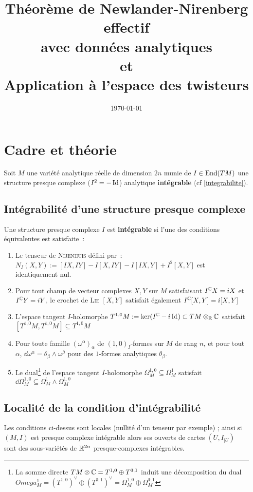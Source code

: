 \documentclass[a4paper,draft]{amsart}
\title[Newlander-Nirenberg effectif]{Th\'eor\`eme de Newlander-Nirenberg effectif\\ avec donn\'ees analytiques\\
et\\
Application \`a l'espace des twisteurs}
\date\today
\begin{document}
\maketitle

\tableofcontents

\section{Cadre et théorie}
Soit $M$ une variété analytique réelle de dimension $2n$ munie de $I \in \text{End}(TM)$ une structure presque complexe ($I^2 = -\operatorname{Id}$) analytique \textbf{intégrable} (cf \ref{integrabilite}).

\subsection{Intégrabilité d'une structure presque complexe\label{integrabilite}}\cite{Godbillon1969,Voisin2002}
Une structure presque complexe $I$ est \textbf{intégrable} si l'une des conditions équivalentes est satisfaite~:
\begin{enumerate}[($i$)]
\item Le tenseur de \textsc{Nijenhuis} défini par~: $N_I(X,Y) := [ I X , I Y ] - I [ X , I Y ] - I [ I X , Y ] + I^2 [ X , Y ]$ est identiquement nul.
\item Pour tout champ de vecteur complexes $X,Y$ sur $M$ satisfaisant $I^{\mathbb{C}} X=iX$ et $I^{\mathbb{C}} Y=iY$, le crochet de \textsc{Lie} $[X,Y]$ satisfait également $I^{\mathbb{C}}[X,Y] = i[X,Y]$
\item L'espace tangent $I$-holomorphe $T^{1,0}M := \ker(I^{\mathbb{C}} -  i\operatorname{Id}) \subset TM \otimes_{\mathbb{R}} \mathbb{C}$ satisfait $[T^{1,0}M,T^{1,0}M] \subseteq T^{1,0}M$
\item Pour toute famille $(\omega^\alpha)_\alpha$ de $(1,0)_I$-formes sur $M$ de rang $n$, et pour tout $\alpha$, $\dd \omega^\alpha = \theta_\beta \wedge \omega^\beta$ pour des $1$-formes analytiques $\theta_\beta$.
\item Le dual\footnote{La somme directe $TM \otimes \mathbb{C}  = T^{1,0} \oplus T^{0,1}$ induit une décomposition du dual $Omega^1_M = (T^{1,0})^\vee \oplus (T^{0,1})^\vee = \Omega_M^{1,0} \oplus  \Omega_M^{0,1} $} de l'espace tangent $I$-holomorphe $\Omega^{1,0}_M \subseteq \Omega^1_M$ satisfait $\dd \Omega^{1,0}_M \subseteq \Omega^1_M \wedge \Omega^{1,0}_M$
\end{enumerate}

\subsection{Localité de la condition d'intégrabilité}
Les conditions ci-dessus sont locales (nullité d'un tenseur par exemple) ; ainsi si $(M,I)$ est presque complexe intégrable alors ses ouverts de cartes $(U,I_{\vert U})$ sont des sous-variétés de $\mathbb{R}^{2n}$ presque-complexes intégrables.
\end{document}
